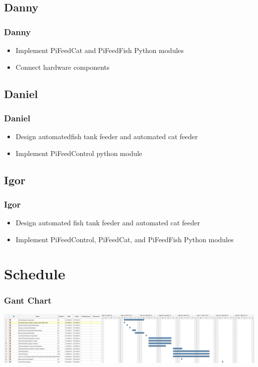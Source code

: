 \documentclass[]{beamer}
\begin{document}
\subsection{Danny}
\begin{frame}
	\frametitle{Danny}
	\begin{itemize}
    	\item Implement PiFeedCat and PiFeedFish Python modules
        \item Connect hardware components
    \end{itemize}
\end{frame}

\subsection{Daniel}
\begin{frame}
	\frametitle{Daniel}
	\begin{itemize}
    	\item Design automatedfish tank feeder and automated cat feeder
        \item Implement PiFeedControl python module
    \end{itemize}
\end{frame}

\subsection{Igor}
\begin{frame}
	\frametitle{Igor}
	\begin{itemize}
    	\item Design automated fish tank feeder and automated cat feeder
        \item Implement PiFeedControl, PiFeedCat, and PiFeedFish Python modules
    \end{itemize}
\end{frame}



\section{Schedule}
\begin{frame}
	\frametitle{Gant Chart}
     \includegraphics[width=\textwidth]{Gant}
\end{frame}
\end{document}

